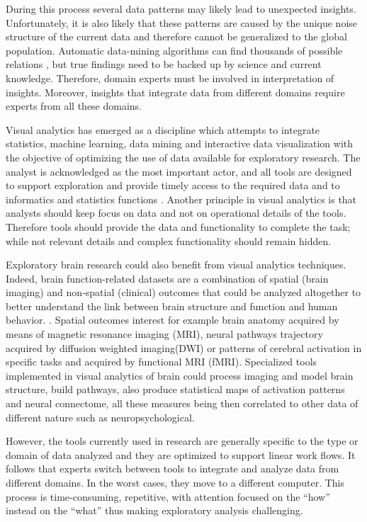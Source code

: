 \documentclass[twocolumn]{svjour3} %
\begin{document}
During this process several data patterns may likely lead to unexpected insights. Unfortunately, it is also likely that these patterns are caused by the unique noise structure of the current data and therefore cannot be generalized to the global population. Automatic data-mining algorithms can find thousands of possible relations , but true findings need to be backed up by science and current knowledge.  Therefore, domain experts must be involved in interpretation of insights. Moreover, insights that integrate data from different domains require experts from all these domains.

Visual analytics \cite{keim_visual_2008} has emerged as a discipline which attempts to integrate statistics, machine learning, data mining and interactive data visualization with the objective of optimizing the use of data available for exploratory research. The analyst is acknowledged as the most important actor, and all tools are designed to support exploration and provide timely access to the required data and to informatics and statistics functions . Another principle in visual analytics is that analysts should keep focus on data and not on operational details of the tools. Therefore tools should provide the data and functionality to complete the task; while not relevant details and complex functionality should remain hidden. 
					
Exploratory brain research  could also benefit from visual analytics techniques. Indeed, brain function-related datasets are a combination of spatial (brain imaging) and non-spatial (clinical) outcomes that could be analyzed altogether to better understand the link between brain structure and function and human behavior. . Spatial outcomes interest for example brain anatomy acquired by means of magnetic resonance imaging (MRI), neural pathways trajectory acquired by diffusion weighted imaging(DWI) or patterns of cerebral activation in specific tasks and acquired by functional MRI (fMRI). Specialized tools implemented in visual analytics of brain could process imaging and model brain structure, build pathways, also produce statistical maps of activation patterns and neural connectome, all these measures being then correlated to other data of different nature such as neuropsychological.

However, the tools currently used in research are generally specific to the type or domain of data analyzed and they are optimized to support linear work flows. It follows that experts switch between tools to integrate and analyze data from different domains. In the worst cases, they move to a different computer. This process is time-consuming, repetitive, with attention focused on the ``how'' instead on the ``what'' thus making exploratory analysis challenging.
\end{document}
